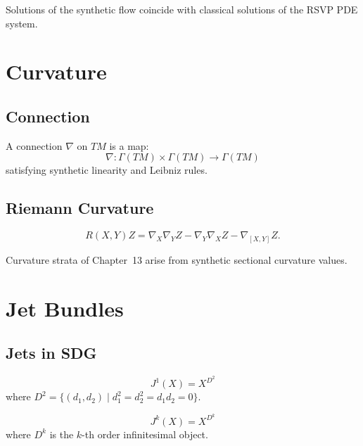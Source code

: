 \begin{proposition}
Solutions of the synthetic flow coincide with classical solutions of the RSVP PDE system.
\end{proposition}

\section{Curvature}

\subsection{Connection}

\begin{definition}
A connection $\nabla$ on $TM$ is a map:
\[
\nabla : \Gamma(TM) \times \Gamma(TM) \to \Gamma(TM)
\]
satisfying synthetic linearity and Leibniz rules.
\end{definition}

\subsection{Riemann Curvature}

\begin{definition}
\[
R(X,Y)Z =
\nabla_X \nabla_Y Z
 - \nabla_Y \nabla_X Z
 - \nabla_{[X,Y]} Z.
\]
\end{definition}

\begin{proposition}
Curvature strata of Chapter~13 arise from synthetic sectional curvature values.
\end{proposition}

\section{Jet Bundles}

\subsection{Jets in SDG}

\begin{definition}[1-Jet]
\[
J^1(X) = X^{D^2}
\]
where $D^2 = \{ (d_1,d_2) \mid d_1^2=d_2^2 = d_1 d_2 = 0 \}$.
\end{definition}

\begin{definition}[k-Jet]
\[
J^k(X) = X^{D^k}
\]
where $D^k$ is the $k$-th order infinitesimal object.
\end{definition}

